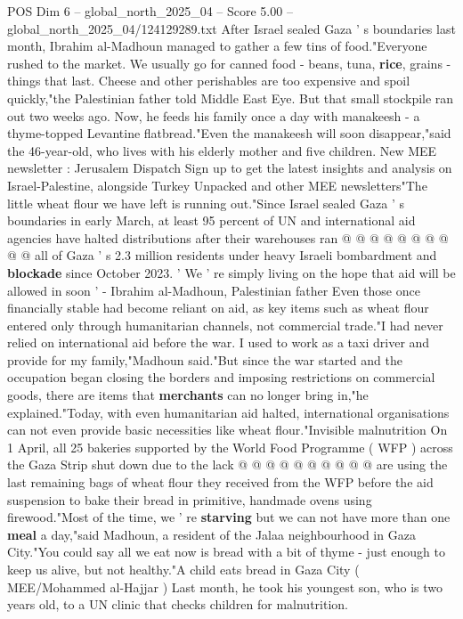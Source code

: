 \begin{textsample}{POS Dim 6 – global\_north\_2025\_04 – Score 5.00 – global\_north\_2025\_04/124129289.txt}  \label{ex:f6_pos_197}
After Israel sealed Gaza ' s boundaries last month, Ibrahim al-Madhoun managed to gather a few tins of food."Everyone rushed to the market.
We usually go for canned food - beans, tuna, \textbf{rice}, grains - things that last.
Cheese and other perishables are too expensive and spoil quickly,"the Palestinian father told Middle East Eye.
But that small stockpile ran out two weeks ago.
Now, he feeds his family once a day with manakeesh - a thyme-topped Levantine flatbread."Even the manakeesh will soon disappear,"said the 46-year-old, who lives with his elderly mother and five children.
New MEE newsletter : Jerusalem Dispatch Sign up to get the latest insights and analysis on Israel-Palestine, alongside Turkey Unpacked and other MEE newsletters"The little wheat flour we have left is running out."Since Israel sealed Gaza ' s boundaries in early March, at least 95 percent of UN and international aid agencies have halted distributions after their warehouses ran @ @ @ @ @ @ @ @ @ @ all of Gaza ' s 2.3 million residents under heavy Israeli bombardment and \textbf{blockade} since October 2023. ' We ' re simply living on the hope that aid will be allowed in soon ' - Ibrahim al-Madhoun, Palestinian father Even those once financially stable had become reliant on aid, as key items such as wheat flour entered only through humanitarian channels, not commercial trade."I had never relied on international aid before the war.
I used to work as a taxi driver and provide for my family,"Madhoun said."But since the war started and the occupation began closing the borders and imposing restrictions on commercial goods, there are items that \textbf{merchants} can no longer bring in,"he explained."Today, with even humanitarian aid halted, international organisations can not even provide basic necessities like wheat flour."Invisible malnutrition On 1 April, all 25 bakeries supported by the World Food Programme ( WFP ) across the Gaza Strip shut down due to the lack @ @ @ @ @ @ @ @ @ @ are using the last remaining bags of wheat flour they received from the WFP before the aid suspension to bake their bread in primitive, handmade ovens using firewood."Most of the time, we ' re \textbf{starving} but we can not have more than one \textbf{meal} a day,"said Madhoun, a resident of the Jalaa neighbourhood in Gaza City."You could say all we eat now is bread with a bit of thyme - just enough to keep us alive, but not healthy."A child eats bread in Gaza City ( MEE/Mohammed al-Hajjar ) Last month, he took his youngest son, who is two years old, to a UN clinic that checks children for malnutrition.

\end{textsample}
